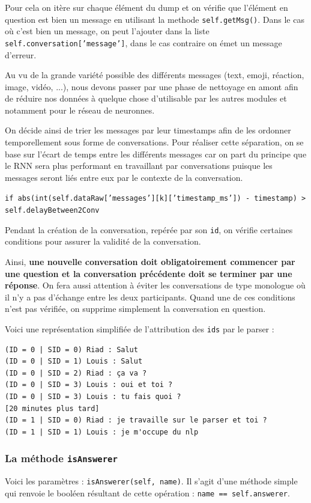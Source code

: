 \documentclass[10pt,a4paper]{article}
\begin{document}
Pour cela on itère sur chaque élément du dump et on vérifie que l'élément en question est bien un message en utilisant la methode \texttt{self.getMsg()}. Dans le cas où c'est bien un message, on peut l'ajouter dans la liste \texttt{self.conversation['message']}, dans le cas contraire on émet un message d'erreur.

Au vu de la grande variété possible des différents messages (text, emoji, réaction, image, vidéo, ...), nous devons passer par une phase de nettoyage en amont afin de réduire nos données à quelque chose d'utilisable par les autres modules et notamment pour le réseau de neuronnes.

On décide ainsi de trier les messages par leur timestamps afin de les ordonner temporellement sous forme de conversations. Pour réaliser cette séparation, on se base sur l'écart de temps entre les différents messages car on part du principe que le RNN sera plus performant en travaillant par conversations puisque les messages seront liés entre eux par le contexte de la conversation.

\begin{center}
	\texttt{if abs(int(self.dataRaw['messages'][k]['timestamp\_ms']) - timestamp) > self.delayBetween2Conv}
\end{center}

Pendant la création de la conversation, repérée par son \texttt{id}, on vérifie certaines conditions pour assurer la validité de la conversation.

Ainsi, \textbf{une nouvelle conversation doit obligatoirement commencer par une question et la conversation précédente doit se terminer par une réponse}. On fera aussi attention à éviter les conversations de type monologue où il n'y a pas d'échange entre les deux participants. Quand une de ces conditions n'est pas vérifiée, on supprime simplement la conversation en question.

Voici une représentation simplifiée de l'attribution des \texttt{ids} par le parser :

\begin{verbatim}
(ID = 0 | SID = 0) Riad : Salut
(ID = 0 | SID = 1) Louis : Salut
(ID = 0 | SID = 2) Riad : ça va ?
(ID = 0 | SID = 3) Louis : oui et toi ?
(ID = 0 | SID = 3) Louis : tu fais quoi ?
[20 minutes plus tard]
(ID = 1 | SID = 0) Riad : je travaille sur le parser et toi ?
(ID = 1 | SID = 1) Louis : je m'occupe du nlp
\end{verbatim}

\subsubsection{La méthode \texttt{isAnswerer}}
Voici les paramètres : \texttt{isAnswerer(self, name)}. Il s'agit d'une méthode simple qui renvoie le booléen résultant de cette opération : \texttt{name == self.answerer}.
\end{document}
